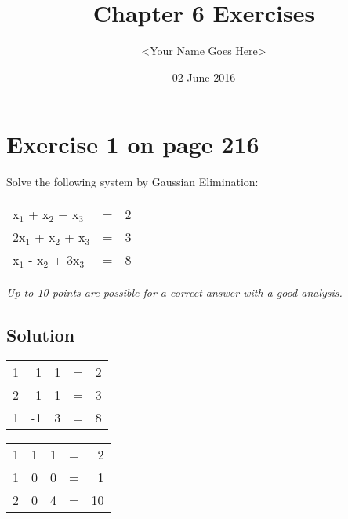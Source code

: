 \documentclass[11pt]{article}
\title{Chapter 6 Exercises}
\author{<Your Name Goes Here>}
\date{02 June 2016}
\begin{document}
\maketitle


\section*{Exercise 1 on page 216}
\label{sec-1}


Solve the following system by Gaussian Elimination:


\begin{center}
\begin{tabular}{llr}
 x$_1$ + x$_2$ + x$_3$   &  =  &  2  \\
 2x$_1$ + x$_2$ + x$_3$  &  =  &  3  \\
 x$_1$ - x$_2$ + 3x$_3$  &  =  &  8  \\
\end{tabular}
\end{center}



\emph{Up to 10 points are possible for a correct answer with a good analysis.}

\subsection*{Solution}
\label{sec-1.1}



\begin{center}
\begin{tabular}{rrrlr}
 1  &   1  &  1  &  =  &  2  \\
 2  &   1  &  1  &  =  &  3  \\
 1  &  -1  &  3  &  =  &  8  \\
\end{tabular}
\end{center}





\begin{center}
\begin{tabular}{rrrlr}
 1  &  1  &  1  &  =  &   2  \\
 1  &  0  &  0  &  =  &   1  \\
 2  &  0  &  4  &  =  &  10  \\
\end{tabular}
\end{center}
\end{document}
